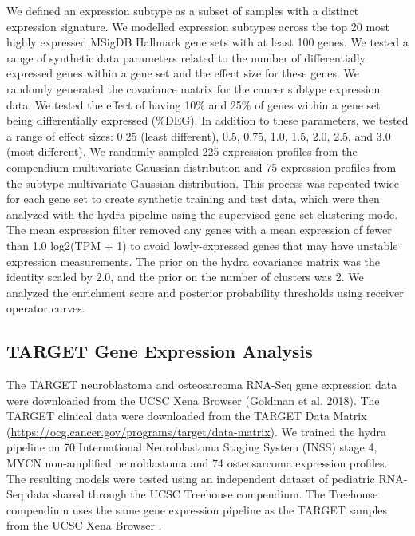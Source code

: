 \documentclass[10pt,letterpaper]{article}
\begin{document}
We defined an expression subtype as a subset of samples with a distinct expression signature. We modelled expression subtypes across the top 20 most highly expressed MSigDB Hallmark gene sets with at least 100 genes. We tested a range of synthetic data parameters related to the number of differentially expressed genes within a gene set and the effect size for these genes. We randomly generated the covariance matrix for the cancer subtype expression data. We tested the effect of having 10\% and 25\% of genes within a gene set being differentially expressed (\%DEG). In addition to these parameters, we tested a range of effect sizes: 0.25 (least different), 0.5, 0.75, 1.0, 1.5, 2.0, 2.5, and 3.0 (most different). We randomly sampled 225 expression profiles from the compendium multivariate Gaussian distribution and 75 expression profiles from the subtype multivariate Gaussian distribution. This process was repeated twice for each gene set to create synthetic training and test data, which were then analyzed with the hydra pipeline using the supervised gene set clustering mode. The mean expression filter removed any genes with a mean expression of fewer than 1.0 log2(TPM + 1) to avoid lowly-expressed genes that may have unstable expression measurements. The prior on the hydra covariance matrix was the identity scaled by 2.0, and the prior on the number of clusters was 2. We analyzed the enrichment score and posterior probability thresholds using receiver operator curves.


\subsection{TARGET Gene Expression Analysis}
The TARGET neuroblastoma and osteosarcoma RNA-Seq gene expression data were downloaded from the UCSC Xena Browser (Goldman et al. 2018). The TARGET clinical data were downloaded from the TARGET Data Matrix (\url{https://ocg.cancer.gov/programs/target/data-matrix}). We trained the hydra pipeline on 70 International Neuroblastoma Staging System (INSS) stage 4, MYCN non-amplified neuroblastoma and 74 osteosarcoma expression profiles. The resulting models were tested using an independent dataset of pediatric RNA-Seq data shared through the UCSC Treehouse compendium. The Treehouse compendium uses the same gene expression pipeline as the TARGET samples from the UCSC Xena Browser \cite{vivianToilEnablesReproducible2017}.
 
\end{document}

